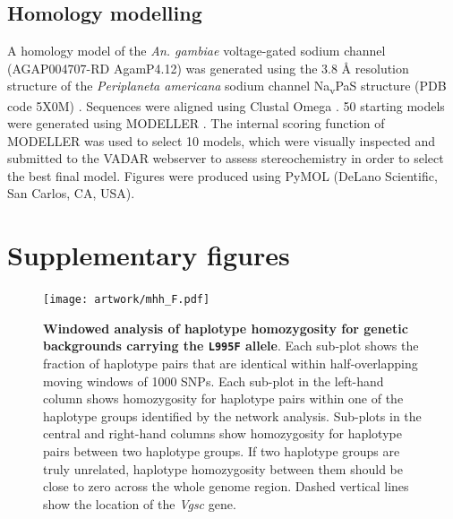 \documentclass[a4paper,11pt,abstracton,hidelinks]{scrartcl}
\newcommand{\beginsupplement}{%
  \setcounter{table}{0}
  \renewcommand{\thetable}{S\arabic{table}}%
  \setcounter{figure}{0}
  \renewcommand{\thefigure}{S\arabic{figure}}%
}
\begin{document}
\subsection*{Homology modelling}

%
A homology model of the \textit{An. gambiae} voltage-gated sodium channel (AGAP004707-RD AgamP4.12) was generated using the 3.8 \r{A} resolution structure of the \textit{Periplaneta americana} sodium channel Na\textsubscript{v}PaS structure (PDB code 5X0M)  \cite{Shen2017}.
%
Sequences were aligned using Clustal Omega \cite{Sievers2011}.
%
50 starting models were generated using MODELLER \cite{Eswar2007}.
%
The internal scoring function of MODELLER was used to select 10 models, which were visually inspected and submitted to the VADAR webserver \cite{Willard2003} to assess stereochemistry in order to select the best final model.
%
Figures were produced using PyMOL (DeLano Scientific, San Carlos, CA, USA).
%




\printbibliography

\beginsupplement
\section*{Supplementary figures}

\clearpage

%
\begin{figure}[!b]
  \texttt{[image: artwork/mhh\_F.pdf]}
  \caption{\textbf{Windowed analysis of haplotype homozygosity for genetic backgrounds carrying the \texttt{L995F} allele}. Each sub-plot shows the fraction of haplotype pairs that are identical within half-overlapping moving windows of 1000 SNPs. Each sub-plot in the left-hand column shows homozygosity for haplotype pairs within one of the haplotype groups identified by the network analysis. Sub-plots in the central and right-hand columns show homozygosity for haplotype pairs between two haplotype groups. If two haplotype groups are truly unrelated, haplotype homozygosity between them should be close to zero across the whole genome region. Dashed vertical lines show the location of the \textit{Vgsc} gene.}
  \label{fig:mhh_f}
\end{figure}
\end{document}
